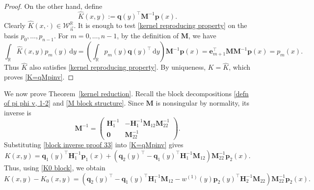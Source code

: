 \documentclass[a4paper,10pt,leqno]{amsart}
\numberwithin{equation}{section}
\theoremstyle{remark}
\newcommand{\dd}{\mathrm{d}}
\begin{document}
\begin{proof}
On the other hand, define
\begin{equation}
    \widehat K(x,y):=\bm q(y)^\top\bm M^{-1}\bm p(x).
\end{equation}
Clearly $\widehat K(x,\cdot)\in\mathcal W_{\vec n}^{\mathbb R}$. It is enough to test \eqref{kernel reproducing property} on the basis $p_0,\ldots,p_{n-1}$. For $m=0,\ldots,n-1$, by the definition of $\bm M$, we have
\begin{equation}
    \int_{\mathbb R}\widehat K(x,y)p_m(y)\,\dd y
    = \left(\int_{\mathbb R}p_m(y)\bm q(y)^\top\,\dd y\right)\bm M^{-1}\bm p(x)
    =\bm e_{m+1}^\top\bm M\bm M^{-1}\bm p(x) =p_m(x).
\end{equation}
Thus $\widehat K$ also satisfies \eqref{kernel reproducing property}. By uniqueness, $K=\widehat K$, which proves \eqref{K=qMpinv}.
\end{proof}

We now prove Theorem~\ref{kernel reduction}. Recall the block decompositions \eqref{defn of pi phi v, 1-2} and \eqref{M block structure}. Since $\bm M$ is nonsingular by normality, its inverse is
\begin{equation}\label{block inverse proof 33}
    \bm M^{-1}=
    \begin{pmatrix}
        \bm H_1^{-1} & -\bm H_1^{-1}\bm M_{12}\bm M_{22}^{-1}\\
        \bm 0        & \bm M_{22}^{-1}
    \end{pmatrix}.
\end{equation}
Substituting \eqref{block inverse proof 33} into \eqref{K=qMpinv} gives
\begin{equation}\label{K block proof 33}
    K(x,y)
    = \bm q_1(y)^\top\bm H_1^{-1}\bm p_1(x)+\left( \bm q_2(y)^\top -\bm q_1(y)^\top\bm H_1^{-1}\bm M_{12}  \right) \bm M_{22}^{-1}\bm p_2(x).
\end{equation}
Thus, using \eqref{K0 block}, we obtain
\begin{equation}\label{kernel difference proof 33}
    K(x,y)-K_0(x,y)
    =\left( \bm q_2(y)^\top - \bm q_1(y)^\top\bm H_1^{-1}\bm M_{12} -   w^{(1)}(y)\bm p_2(y)^\top\bm H_2^{-1}\bm M_{22} \right) \bm M_{22}^{-1}\bm p_2(x).
\end{equation}
\end{document}
